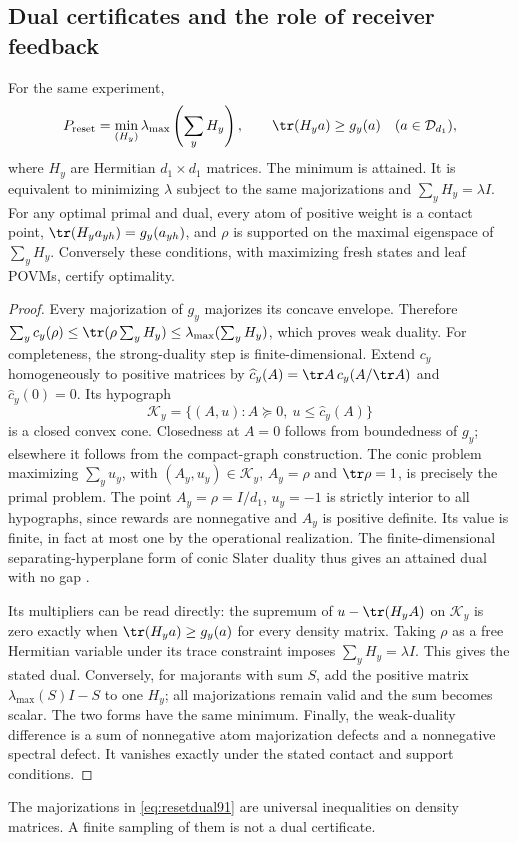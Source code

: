 \subsection{Dual certificates and the role of receiver feedback}
\begin{theorem}\label{thm:resetdual91}
For the same experiment,
\begin{equation}\label{eq:resetdual91}
 P_{\rm reset}=\min_{(H_y)}\lambda_{\max}\left(\sum_yH_y\right),
 \qquad \tr(H_ya)\ge g_y(a)\quad(a\in\mathcal D_{d_1}),
\end{equation}
where $H_y$ are Hermitian $d_1\times d_1$ matrices.  The minimum is
attained.  It is equivalent to minimizing $\lambda$ subject to the
same majorizations and $\sum_yH_y=\lambda I$.
For any optimal primal and dual, every atom of positive weight is a
contact point, $\tr(H_ya_{yh})=g_y(a_{yh})$, and $\rho$ is supported
on the maximal eigenspace of $\sum_yH_y$.  Conversely these conditions,
with maximizing fresh states and leaf POVMs, certify optimality.
\end{theorem}
\begin{proof}
Every majorization of $g_y$ majorizes its concave envelope.  Therefore
$\sum_yc_y(\rho)\le\tr(\rho\sum_yH_y)\le
\lambda_{\max}(\sum_yH_y)$, which proves weak duality.
For completeness, the strong-duality step is finite-dimensional.
Extend $c_y$ homogeneously to positive matrices by
$\widehat c_y(A)=\tr A\,c_y(A/\tr A)$ and $\widehat c_y(0)=0$.
Its hypograph
\[
 \mathcal K_y=\{(A,u):A\succeq0,\ u\le\widehat c_y(A)\}
\]
is a closed convex cone.  Closedness at $A=0$ follows from boundedness
of $g_y$; elsewhere it follows from the compact-graph construction.
The conic problem maximizing $\sum_yu_y$, with $(A_y,u_y)\in\mathcal K_y$,
$A_y=\rho$ and $\tr\rho=1$, is precisely the primal problem.
The point $A_y=\rho=I/d_1$, $u_y=-1$ is strictly interior to all
hypographs, since rewards are nonnegative and $A_y$ is positive definite.
Its value is finite, in fact at most one by the operational realization.
The finite-dimensional separating-hyperplane form of conic Slater
duality thus gives an attained dual with no gap
\cite[Sections~5.2.3 and~5.9.1]{BV91}.

Its multipliers can be read directly: the supremum of
$u-\tr(H_yA)$ on $\mathcal K_y$ is zero exactly when
$\tr(H_ya)\ge g_y(a)$ for every density matrix.  Taking $\rho$ as a
free Hermitian variable under its trace constraint imposes
$\sum_yH_y=\lambda I$.  This gives the stated dual.  Conversely, for
majorants with sum $S$, add the positive matrix
$\lambda_{\max}(S)I-S$ to one $H_y$; all majorizations remain valid
and the sum becomes scalar.  The two forms have the same minimum.
Finally, the weak-duality difference is a sum of nonnegative atom
majorization defects and a nonnegative spectral defect.  It vanishes
exactly under the stated contact and support conditions.
\end{proof}
The majorizations in \eqref{eq:resetdual91} are universal inequalities
on density matrices.  A finite sampling of them is not a dual certificate.


